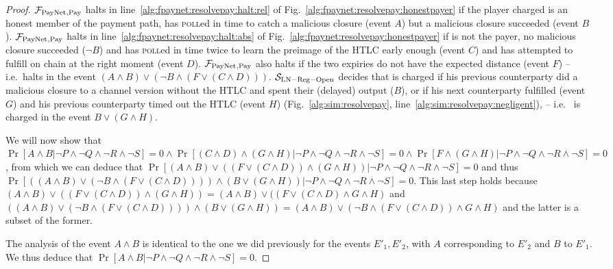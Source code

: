 \begin{proof}
  $\mathcal{F}_{\mathrm{PayNet}}{}_{\mathrm{, Pay}}$ halts in
  line~\ref{alg:fpaynet:resolvepay:halt:rel} of
  Fig.~\ref{alg:fpaynet:resolvepay:honestpayer} if the player \dave{} charged is
  an honest member of the payment path, has \textsc{poll}ed in time to catch a
  malicious closure (event $A$) but a malicious closure succeeded (event $B$).
  $\mathcal{F}_{\mathrm{PayNet}}{}_{\mathrm{, Pay}}$ halts in
  line~\ref{alg:fpaynet:resolvepay:halt:abs} of
  Fig.~\ref{alg:fpaynet:resolvepay:honestpayer} if \dave{} is not the payer, no
  malicious closure succeeded ($\neg B$) and \dave{} has \textsc{poll}ed in time
  twice to learn the preimage of the HTLC early enough (event $C$) and has
  attempted to fulfill on chain at the right moment (event $D$).
  $\mathcal{F}_{\mathrm{PayNet}}{}_{\mathrm{, Pay}}$ also halts if the two expiries do not have the
  expected distance (event $F$) -- i.e.\ halts in the event $(A \wedge B) \vee
  (\neg B \wedge (F \vee (C \wedge D)))$. $\mathcal{S}_{\mathrm{LN - Reg -
  Open}}$ decides that \dave{} is charged if his previous counterparty did a
  malicious closure to a channel version without the HTLC and spent their
  (delayed) output ($B$), or if his next counterparty fulfilled (event $G$) and
  his previous counterparty timed out the HTLC (event $H$)
  (Fig.~\ref{alg:sim:resolvepay}, line~\ref{alg:sim:resolvepay:negligent}), --
  i.e.\ \dave{} is charged in the event $B \vee (G \wedge H)$.

  We will now show that $\Pr[A \wedge B | \neg P \wedge \neg Q \wedge \neg R
  \wedge \neg S] = 0 \wedge \Pr[(C \wedge D) \wedge (G \wedge H) | \neg P \wedge
  \neg Q \wedge \neg R \wedge \neg S] = 0 \wedge \Pr[F \wedge (G \wedge H) |
  \neg P \wedge \neg Q \wedge \neg R \wedge \neg S] = 0$, from which we can
  deduce that $\Pr[(A \wedge B) \vee ((F \vee (C \wedge D)) \wedge (G \wedge H))
  | \neg P \wedge \neg Q \wedge \neg R \wedge \neg S] = 0$ and thus $\Pr[((A
  \wedge B) \vee (\neg B \wedge (F \vee (C \wedge D)))) \wedge (B \vee (G \wedge
  H)) | \neg P \wedge \neg Q \wedge \neg R \wedge \neg S] = 0$. This last step
  holds because $(A \wedge B) \vee ((F \vee (C \wedge D)) \wedge (G \wedge H)) =
  (A \wedge B) \vee ((F \vee (C \wedge D) \wedge G \wedge H)$ and $((A \wedge B)
  \vee (\neg B \wedge (F \vee (C \wedge D)))) \wedge (B \vee (G \wedge H)) = (A
  \wedge B) \vee (\neg B \wedge (F \vee (C \wedge D)) \wedge G \wedge H)$ and
  the latter is a subset of the former.

  The analysis of the event $A \wedge B$ is identical to the one we did
  previously for the events $E'_1, E'_2$, with $A$ corresponding to $E'_2$ and
  $B$ to $E'_1$. We thus deduce that $\Pr[A \wedge B | \neg P \wedge \neg Q
  \wedge \neg R \wedge \neg S] = 0$.


\end{proof}
